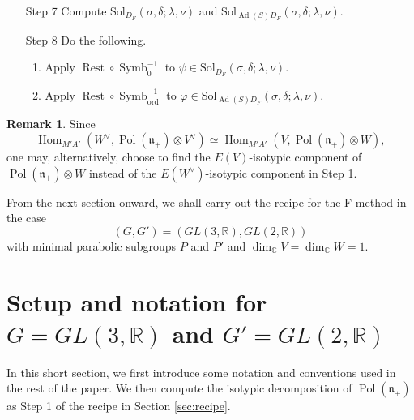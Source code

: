 \documentclass[a4paper,11pt,reqno]{amsart}
\newcommand{\frakn}{\mathfrak{n}}
\newcommand{\RR}{\mathbb{R}}
\newcommand{\0}{{\bf 0}}
\newcommand{\R}{\mathbb{R}}
\newcommand{\C}{\mathbb{C}}
\newcommand{\1}{{\bf 1}}
\DeclareMathOperator{\Ad}{Ad}
\DeclareMathOperator{\Hom}{Hom}
\DeclareMathOperator{\Pol}{Pol}
\newcommand{\ord}{{\mathrm{ord}}}
\DeclareMathOperator{\Symb}{Symb}
\DeclareMathOperator{\Rest}{Rest}
\theoremstyle{plain}
\theoremstyle{definition}
\newtheorem{remark}[equation]{Remark}
\numberwithin{equation}{section}
\theoremstyle{definition}
\begin{document}
\begin{enumerate}
\begin{enumerate}
\vskip 0.1in

\item[Step 7]
Compute $\mathrm{Sol}_{D_F}(\sigma,\delta;\lambda,\nu)$ 
and 
$\mathrm{Sol}_{\Ad(S)D_F}(\sigma,\delta;\lambda,\nu)$.
\vskip 0.1in

\item[Step 8]
Do the following.
\vspace{3pt}

\begin{enumerate}
\item 
Apply $\Rest \circ \Symb_0^{-1}$
to $\psi \in \mathrm{Sol}_{D_F}(\sigma,\delta;\lambda,\nu)$.
\vspace{5pt}

\item
Apply $\Rest \circ\Symb_{\ord}^{-1}$
to  $\varphi \in \mathrm{Sol}_{\Ad(S)D_F}(\sigma,\delta;\lambda,\nu)$.

\end{enumerate}

\end{enumerate}

\end{enumerate}

\vskip 0.1in

\begin{remark}
Since
\begin{equation*}
\Hom_{M'A'}(W^\vee, \Pol(\frakn_+)\otimes V^\vee)
\simeq 
\Hom_{M'A'}(V, \Pol(\frakn_+)\otimes W),
\end{equation*}
one may, alternatively, choose to find the $E(V)$-isotypic component of 
$\Pol(\frakn_+)\otimes W$ instead of the $E(W^\vee)$-isotypic component in Step 1. 
\end{remark}

From the next section onward, we shall carry out the recipe for the F-method
in the case 
\begin{equation*}
(G,G')=(GL(3,\R), GL(2,\R))
\end{equation*}
 with minimal
parabolic subgroups $P$ and $P'$ and $\dim_\C V=\dim_\C W =1$.


\section{Setup and notation for \texorpdfstring{$G=GL(3,\RR)$}{G=GL(3,R)} and \texorpdfstring{$G'=GL(2,\RR)$}{G'=GL(2,R)}}
\label{sec:GL(3)}

In this short section, we first introduce some 
notation and conventions used in the rest of the paper.
We then compute the isotypic decomposition of $\Pol(\frakn_+)$
as Step 1 of the recipe in Section \ref{sec:recipe}.
\end{document}
